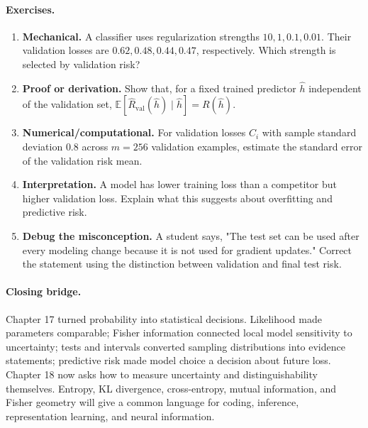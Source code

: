 \paragraph{Exercises.}
\begin{enumerate}[label=\textbf{17.4.\arabic*.}, leftmargin=*]
\item \textbf{Mechanical.} A classifier uses regularization strengths \(10,1,0.1,0.01\). Their validation losses are \(0.62,0.48,0.44,0.47\), respectively. Which strength is selected by validation risk?
\item \textbf{Proof or derivation.} Show that, for a fixed trained predictor \(\hat h\) independent of the validation set, \(\mathbb E[\hat R_{\mathrm{val}}(\hat h)\mid\hat h]=R(\hat h)\).
\item \textbf{Numerical/computational.} For validation losses \(C_i\) with sample standard deviation \(0.8\) across \(m=256\) validation examples, estimate the standard error of the validation risk mean.
\item \textbf{Interpretation.} A model has lower training loss than a competitor but higher validation loss. Explain what this suggests about overfitting and predictive risk.
\item \textbf{Debug the misconception.} A student says, "The test set can be used after every modeling change because it is not used for gradient updates." Correct the statement using the distinction between validation and final test risk.
\end{enumerate}

\paragraph{Closing bridge.}
Chapter 17 turned probability into statistical decisions. Likelihood made parameters comparable; Fisher information connected local model sensitivity to uncertainty; tests and intervals converted sampling distributions into evidence statements; predictive risk made model choice a decision about future loss. Chapter 18 now asks how to measure uncertainty and distinguishability themselves. Entropy, KL divergence, cross-entropy, mutual information, and Fisher geometry will give a common language for coding, inference, representation learning, and neural information.

\clearpage
